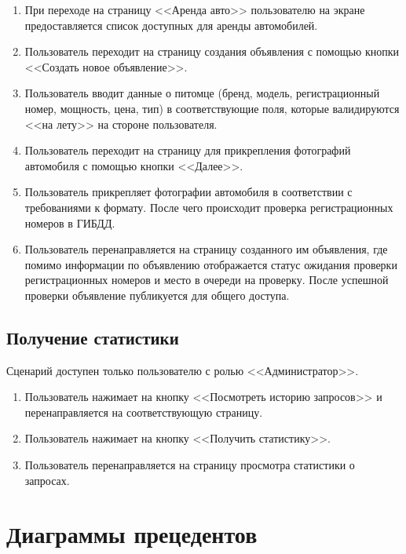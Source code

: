 \begin{enumerate}
	\item При переходе на страницу <<Аренда авто>> пользователю на экране предоставляется список доступных для аренды автомобилей.
	
	\item Пользователь переходит на страницу создания объявления с помощью кнопки <<Создать новое объявление>>.
	
	\item Пользователь вводит данные о питомце (бренд, модель, регистрационный номер, мощность, цена, тип) в соответствующие поля, которые валидируются <<на лету>> на стороне пользователя.
	
	\item Пользователь переходит на страницу для прикрепления фотографий автомобиля с помощью кнопки <<Далее>>.
	
	\item Пользователь прикрепляет фотографии автомобиля в соответствии с требованиями к формату. После чего происходит проверка регистрационных номеров в ГИБДД.
	
	\item Пользователь перенаправляется на страницу созданного им объявления, где помимо информации по объявлению отображается статус ожидания проверки регистрационных номеров и место в очереди на проверку. После успешной проверки объявление публикуется для общего доступа.
\end{enumerate}

\subsection*{Получение статистики}

Сценарий доступен только пользователю с ролью <<Администратор>>.

\begin{enumerate}
	\item Пользователь нажимает на кнопку <<Посмотреть историю запросов>> и перенаправляется на соответствующую страницу.
	
	\item Пользователь нажимает на кнопку <<Получить статистику>>.
	
	\item Пользователь перенаправляется на страницу просмотра статистики о запросах.
\end{enumerate}

\section{Диаграммы прецедентов}

